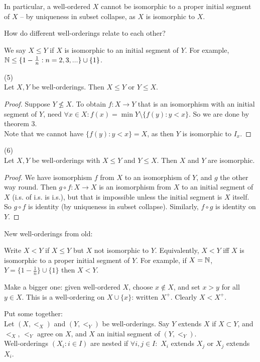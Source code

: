 \documentclass[a4paper]{article}
\begin{document}
In particular, a well-ordered $X$ cannot be isomorphic to a proper initial segment of $X$ -- by uniqueness in subset collapse, as $X$ is isomorphic to $X$.

How do different well-orderings relate to each other?

We say $X \leq Y$ if $X$ is isomorphic to an initial segment of $Y$. For example, $\mathbb{N} \leq \{1-\frac{1}{n}:n=2,3,...\}\cup\{1\}$.

\begin{thm} (5)\\
Let $X,Y$ be well-orderings. Then $X\leq Y$ or $Y \leq X$.
\begin{proof}
Suppose $Y \not\leq X$. To obtain $f:X \to Y$ that is an isomorphism with an initial segment of $Y$, need $\forall x \in X: f(x) = \min Y \setminus \{f(y):y<x\}$. So we are done by theorem 3.\\
Note that we cannot have $\{f(y):y<x\} = X$, as then $Y$ is isomorphic to $I_x$.
\end{proof}
\end{thm}

\begin{prop} (6)\\
Let $X,Y$ be well-orderings with $X \leq Y$ and $Y \leq X$. Then $X$ and $Y$ are isomorphic.
\begin{proof}
We have isomorphism $f$ from $X$ to an isomorphism of $Y$, and $g$ the other way round. Then $g \circ f: X \to X$ is an isomorphism from $X$ to an initial segment of $X$ (i.s. of i.s. is i.s.), but that is impossible unless the initial segment is $X$ itself. So $g\circ f$ is identity (by uniqueness in subset collapse). Similarly, $f \circ g$ is identity on $Y$.
\end{proof}
\end{prop}

New well-orderings from old:

Write $X<Y$ if $X \leq Y$ but $X$ not isomorphic to $Y$. Equivalently, $X < Y$ iff $X$ is isomorphic to a proper initial segment of $Y$. For example, if $X = \mathbb{N}$, $Y = \{1-\frac{1}{n}\} \cup \{1\}$ then $X < Y$.

Make a bigger one: given well-ordered $X$, choose $x \not\in X$, and set $x>y$ for all $y \in X$. This is a well-ordering on $X \cup \{x\}$: written $X^+$. Clearly $X < X^+$.

Put some together:\\
Let $(X,<_X)$ and $(Y,<_Y)$ be well-orderings. Say $Y$ extends $X$ if $X \subset Y$, and $<_X$, $<_Y$ agree on $X$, and $X$ an initial segment of $(Y,<_Y)$.\\
Well-orderings $(X_i: i \in I)$ are nested if $\forall i,j \in I:$ $X_i$ extends $X_j$ or $X_j$ extends $X_i$.
\end{document}
